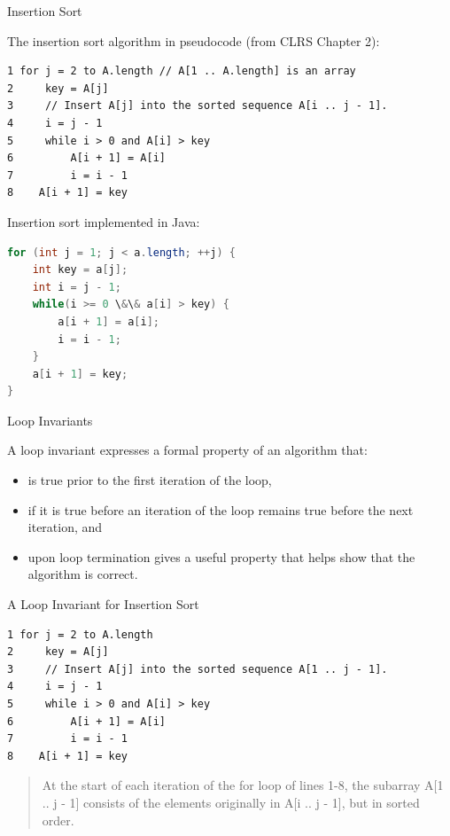 \documentclass{beamer}
\begin{document}
\begin{frame}[fragile]{Insertion Sort}


The insertion sort algorithm in pseudocode (from CLRS Chapter 2):
\vspace{-.05in}
\begin{lstlisting}[]
1 for j = 2 to A.length // A[1 .. A.length] is an array
2     key = A[j]
3     // Insert A[j] into the sorted sequence A[i .. j - 1].
4     i = j - 1
5     while i > 0 and A[i] > key
6         A[i + 1] = A[i]
7         i = i - 1
8    A[i + 1] = key
\end{lstlisting}

Insertion sort implemented in Java:
\vspace{-.05in}
\begin{lstlisting}[language=Java]
for (int j = 1; j < a.length; ++j) {
    int key = a[j];
    int i = j - 1;
    while(i >= 0 \&\& a[i] > key) {
        a[i + 1] = a[i];
        i = i - 1;
    }
    a[i + 1] = key;
}
\end{lstlisting}

\end{frame}

\begin{frame}[fragile]{Loop Invariants}


A loop invariant expresses a formal property of an algorithm that:
\begin{itemize}
\item is true prior to the first iteration of the loop,
\item if it is true before an iteration of the loop remains true before the next iteration, and
\item upon loop termination gives a useful property that helps show that the algorithm is correct.
\end{itemize}


\end{frame}

\begin{frame}[fragile]{A Loop Invariant for Insertion Sort}

\begin{lstlisting}[]
1 for j = 2 to A.length
2     key = A[j]
3     // Insert A[j] into the sorted sequence A[1 .. j - 1].
4     i = j - 1
5     while i > 0 and A[i] > key
6         A[i + 1] = A[i]
7         i = i - 1
8    A[i + 1] = key
\end{lstlisting}

\begin{quote}
At the start of each iteration of the for loop of lines 1-8, the subarray A[1 .. j - 1] consists of the elements originally in A[i .. j - 1], but in sorted order.
\end{quote}

\end{frame}
\end{document}
